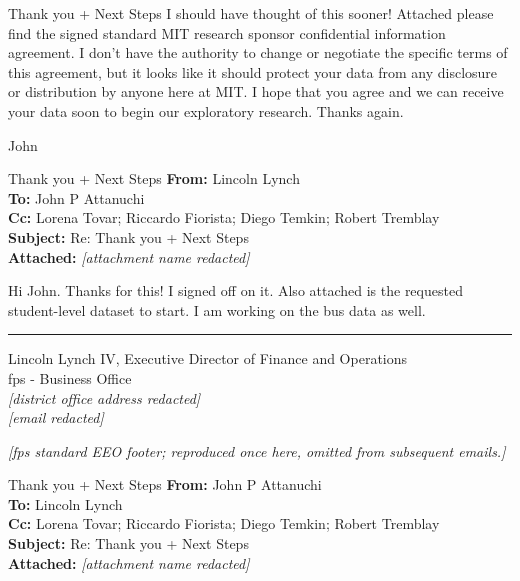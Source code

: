 {\begin{emailbox}{Thank you + Next Steps}
    I should have thought of this sooner! Attached please find the signed standard MIT research sponsor confidential information agreement. I don’t have the authority to change or negotiate the specific terms of this agreement, but it looks like it should protect your data from any disclosure or distribution by anyone here at MIT. I hope that you agree and we can receive your data soon to begin our exploratory research. Thanks again.

    John
\end{emailbox}

\begin{emailbox}{Thank you + Next Steps}
    \textbf{From:} Lincoln Lynch \\
    \textbf{To:} John P Attanuchi \\
    \textbf{Cc:} Lorena Tovar; Riccardo Fiorista; Diego Temkin; Robert Tremblay \\
    \textbf{Subject:} Re: Thank you + Next Steps \\
    \textbf{Attached:} \textit{[attachment name redacted]}

    \vspace{1em}
    Hi John. Thanks for this! I signed off on it. Also attached is the requested student-level dataset to start. I am working on the bus data as well.
    
    \noindent\rule{\textwidth}{1pt}

    Lincoln Lynch IV, Executive Director of Finance and Operations \\
    \Acrlong{fps} - Business Office \\
    \textit{[district office address redacted]} \\
    \textit{[email redacted]} \vspace{1em}

    \textit{[\gls{fps} standard EEO footer; reproduced once here, omitted from subsequent emails.]}
\end{emailbox}

\begin{emailbox}{Thank you + Next Steps}
    \textbf{From:} John P Attanuchi \\
    \textbf{To:} Lincoln Lynch \\
    \textbf{Cc:} Lorena Tovar; Riccardo Fiorista; Diego Temkin; Robert Tremblay \\
    \textbf{Subject:} Re: Thank you + Next Steps \\
    \textbf{Attached:} \textit{[attachment name redacted]}


\end{emailbox}}
